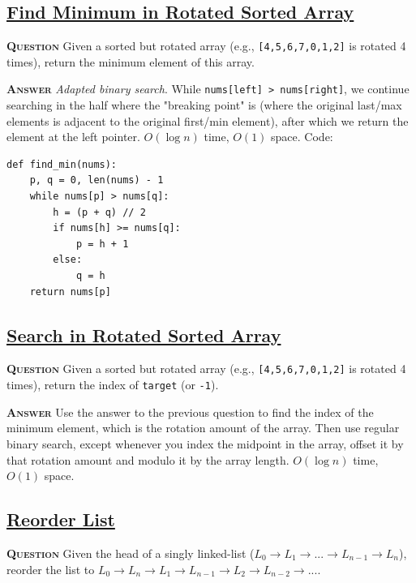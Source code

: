 \documentclass[table, xcdraw]{article}%
\begin{document}
\subsection{\href{https://leetcode.com/problems/find-minimum-in-rotated-sorted-array}{Find Minimum in Rotated Sorted Array}}

\textsc{\textbf{Question}} Given a sorted but rotated array (e.g., \texttt{[4,5,6,7,0,1,2]} is rotated 4 times), return the minimum element of this array.

\textsc{\textbf{Answer}} \textit{Adapted binary search}. While \texttt{nums[left] > nums[right]}, we continue searching in the half where the "breaking point" is (where the original last/max elements is adjacent to the original first/min element), after which we return the element at the left pointer. $O(\log n)$ time, $O(1)$ space. Code:

\begin{verbatim}
def find_min(nums):
    p, q = 0, len(nums) - 1
    while nums[p] > nums[q]:
        h = (p + q) // 2
        if nums[h] >= nums[q]:
            p = h + 1
        else:
            q = h
    return nums[p]
\end{verbatim}

\subsection{\href{https://leetcode.com/problems/search-in-rotated-sorted-array}{Search in Rotated Sorted Array}}

\textsc{\textbf{Question}} Given a sorted but rotated array (e.g., \texttt{[4,5,6,7,0,1,2]} is rotated 4 times), return the index of \texttt{target} (or \texttt{-1}).

\textsc{\textbf{Answer}} Use the answer to the previous question to find the index of the minimum element, which is the rotation amount of the array. Then use regular binary search, except whenever you index the midpoint in the array, offset it by that rotation amount and modulo it by the array length. $O(\log n)$ time, $O(1)$ space.

\subsection{\href{https://leetcode.com/problems/reorder-list}{Reorder List}}

\textsc{\textbf{Question}} Given the head of a singly linked-list ($L_0 \rightarrow L_1 \rightarrow ... \rightarrow L_{n-1} \rightarrow L_n$), reorder the list to $L_0 \rightarrow L_n \rightarrow L_1 \rightarrow L_{n-1} \rightarrow L_2 \rightarrow L_{n-2} \rightarrow ...$.
\end{document}
